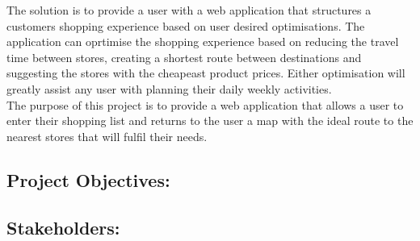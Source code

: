\documentclass[10pt, a4paper, twocolumn]{scrartcl}
\begin{document}
		The solution is to provide a user with a web application that structures a customers shopping experience based on user desired optimisations. The application can oprtimise the shopping experience based on reducing the travel time between stores, creating a shortest route between destinations and suggesting the stores with the cheapeast product prices. Either optimisation will greatly assist any user with planning their daily weekly activities. \\
		
		The purpose of this project is to provide a web application that allows a user to enter their shopping list and returns to the user a map with the ideal route to the nearest stores that will fulfil their needs. 
	
	\subsection{Project Objectives:}
	
	\subsection{Stakeholders:}
	
	


	
\end{document}

